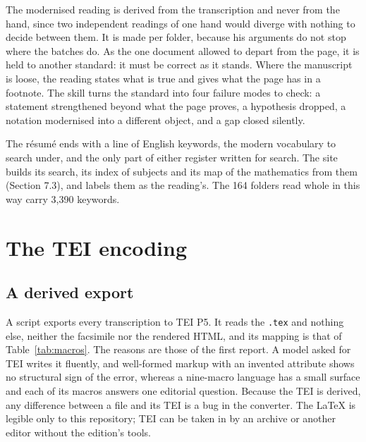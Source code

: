 \documentclass[11pt]{article}
\begin{document}
The modernised reading is derived from the transcription and never from the hand, since two independent readings of one hand would diverge with nothing to decide between them. It is made per folder, because his arguments do not stop where the batches do. As the one document allowed to depart from the page, it is held to another standard: it must be correct as it stands. Where the manuscript is loose, the reading states what is true and gives what the page has in a footnote. The skill turns the standard into four failure modes to check: a statement strengthened beyond what the page proves, a hypothesis dropped, a notation modernised into a different object, and a gap closed silently.

The résumé ends with a line of English keywords, the modern vocabulary to search under, and the only part of either register written for search. The site builds its search, its index of subjects and its map of the mathematics from them (Section 7.3), and labels them as the reading's. The 164 folders read whole in this way carry 3,390 keywords.

\section{The TEI encoding}

\subsection{A derived export}

A script exports every transcription to TEI P5. It reads the \texttt{.tex} and nothing else, neither the facsimile nor the rendered HTML, and its mapping is that of Table~\ref{tab:macros}. The reasons are those of the first report. A model asked for TEI writes it fluently, and well-formed markup with an invented attribute shows no structural sign of the error, whereas a nine-macro language has a small surface and each of its macros answers one editorial question. Because the TEI is derived, any difference between a file and its TEI is a bug in the converter. The LaTeX is legible only to this repository; TEI can be taken in by an archive or another editor without the edition's tools.
\end{document}
